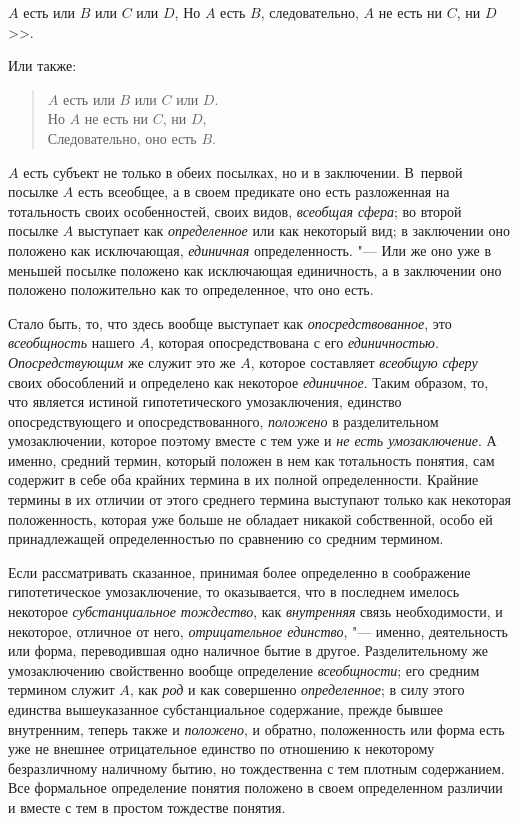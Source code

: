 {{$A$ есть или $B$ или $C$ или $D$,
Но $A$ есть $B$, следовательно, $A$ не есть ни $C$, ни $D$>>.

Или также:

\begin{verse}
$A$ есть или $B$ или $C$ или $D$.\\
Но $A$ не есть ни $C$, ни $D$,\\
Следовательно, оно есть $B$.
\end{verse}

$A$ есть субъект не только в обеих посылках, но и в заключении.
В~первой посылке $A$ есть всеобщее, а
в своем предикате оно есть разложенная на тотальность своих особенностей,
своих видов, {\em всеобщая сфера}; во второй посылке $A$
выступает как {\em определенное} или
как некоторый вид; в заключении оно положено как исключающая, {\em единичная}
определенность. "--- Или же оно уже в меньшей
посылке положено как исключающая единичность, а в заключении оно положено
положительно как то определенное, что оно есть.

Стало быть, то, что здесь вообще выступает как {\em опосредствованное},
это {\em всеобщность} нашего $A$, которая опосредствована с его
{\em единичностью}. {\em Опосредствующим} же служит это же $A$,
которое составляет {\em всеобщую сферу}
своих обособлений и определено как некоторое {\em единичное}. Таким
образом, то, что является истиной гипотетического умозаключения, единство
опосредствующего и опосредствованного, {\em положено} в
разделительном умозаключении, которое поэтому вместе с тем уже и
{\em не есть умозаключение}.
А именно, средний термин, который положен в нем как
тотальность понятия, сам содержит в себе оба крайних термина в их полной
определенности. Крайние термины в их отличии от этого среднего термина
выступают только как некоторая положенность, которая уже больше не обладает
никакой собственной, особо ей принадлежащей определенностью по сравнению со
средним термином.

Если рассматривать сказанное, принимая более определенно в
соображение гипотетическое умозаключение, то оказывается, что в последнем
имелось некоторое {\em субстанциальное тождество}, как {\em внутренняя} связь
необходимости, и некоторое, отличное от него,
{\em отрицательное единство}, "---
именно, деятельность или форма, переводившая одно наличное
бытие в другое. Разделительному же умозаключению свойственно вообще
определение {\em всеобщности}; его средним термином служит $A$,
как {\em род} и как совершенно {\em определенное}; в
силу этого единства вышеуказанное субстанциальное содержание, прежде бывшее
внутренним, теперь также и {\em положено}, и
обратно, положенность или форма есть уже не внешнее отрицательное единство
по отношению к некоторому безразличному наличному бытию, но тождественна с
тем плотным содержанием. Все формальное определение понятия положено в
своем определенном различии и вместе с тем в простом тождестве понятия.

}}
